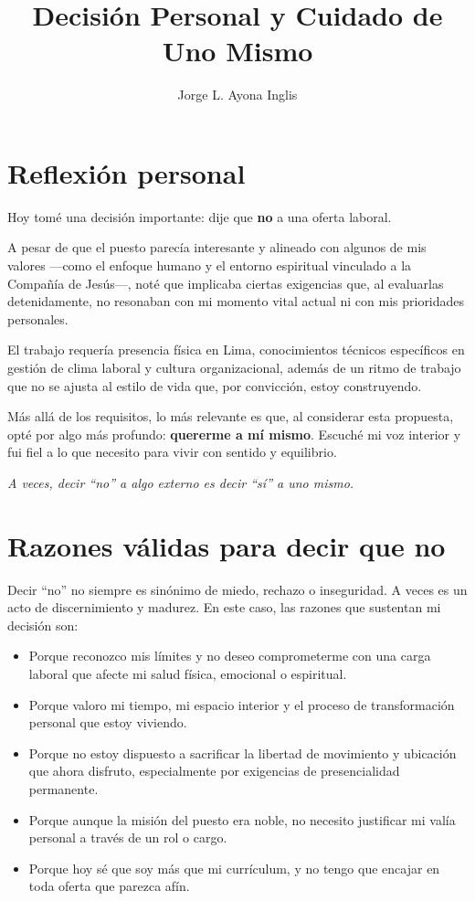 \documentclass[12pt]{article}
\title{Decisión Personal y Cuidado de Uno Mismo}
\author{Jorge L. Ayona Inglis}
\date{}
\begin{document}
	
	\maketitle
	
	\section*{Reflexión personal}
	
	Hoy tomé una decisión importante: dije que \textbf{no} a una oferta laboral.
	
	A pesar de que el puesto parecía interesante y alineado con algunos de mis valores —como el enfoque humano y el entorno espiritual vinculado a la Compañía de Jesús—, noté que implicaba ciertas exigencias que, al evaluarlas detenidamente, no resonaban con mi momento vital actual ni con mis prioridades personales.
	
	El trabajo requería presencia física en Lima, conocimientos técnicos específicos en gestión de clima laboral y cultura organizacional, además de un ritmo de trabajo que no se ajusta al estilo de vida que, por convicción, estoy construyendo.
	
	Más allá de los requisitos, lo más relevante es que, al considerar esta propuesta, opté por algo más profundo: \textbf{quererme a mí mismo}. Escuché mi voz interior y fui fiel a lo que necesito para vivir con sentido y equilibrio.
	
	\textit{A veces, decir “no” a algo externo es decir “sí” a uno mismo.}
	
	\section*{Razones válidas para decir que no}
	
	Decir “no” no siempre es sinónimo de miedo, rechazo o inseguridad. A veces es un acto de discernimiento y madurez. En este caso, las razones que sustentan mi decisión son:
	
	\begin{itemize}
		\item Porque reconozco mis límites y no deseo comprometerme con una carga laboral que afecte mi salud física, emocional o espiritual.
		\item Porque valoro mi tiempo, mi espacio interior y el proceso de transformación personal que estoy viviendo.
		\item Porque no estoy dispuesto a sacrificar la libertad de movimiento y ubicación que ahora disfruto, especialmente por exigencias de presencialidad permanente.
		\item Porque aunque la misión del puesto era noble, no necesito justificar mi valía personal a través de un rol o cargo.
		\item Porque hoy sé que soy más que mi currículum, y no tengo que encajar en toda oferta que parezca afín.
	\end{itemize}
	
\end{document}
